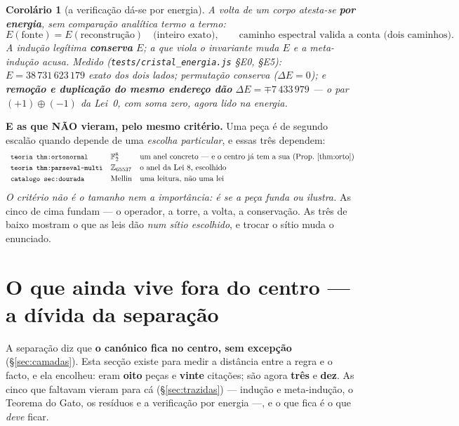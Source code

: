 \documentclass[11pt,a4paper]{article}
\newtheorem{corolario}[teorema]{Corolário}
\newcommand{\code}[1]{\texttt{\small #1}}
\begin{document}
\begin{corolario}[a verificação dá-se por energia]\label{cor:verifica-energia}
A volta de um corpo atesta-se \textbf{por energia}, sem comparação
analítica termo a termo:
\[
\boxed{
E(\text{fonte})=E(\text{reconstrução})
\quad\text{(inteiro exato)},
}
\qquad
\boxed{
\text{caminho espectral valida a conta (dois caminhos)}.
}
\]
A indução legítima \textbf{conserva} $E$; a que viola o invariante muda
$E$ e a meta-indução acusa. Medido
(\code{tests/cristal\_energia.js} \S E0, \S E5):
$E=38\,731\,623\,179$ exato dos dois lados; permutação conserva
($\Delta E=0$); e \textbf{remoção e duplicação do mesmo endereço dão}
$\Delta E=\mp7\,433\,979$ --- o par $(+1)\oplus(-1)$ da Lei~0, com soma
zero, agora lido na energia.
\end{corolario}


\medskip
\noindent\textbf{E as que NÃO vieram, pelo mesmo critério.} Uma peça é de segundo escalão
quando depende de uma \emph{escolha particular}, e essas três dependem:
\[
\begin{array}{lll}
\code{teoria thm:ortonormal} & \mathbb{F}_2^{8} & \text{um anel concreto --- e o centro já tem
a sua (Prop.~\ref{thm:orto})}\\[2pt]
\code{teoria thm:parseval-multi} & \mathbb{Z}_{65537} & \text{o anel da Lei 8, escolhido}\\[2pt]
\code{catalogo sec:dourada} & \text{Mellin} & \text{uma leitura, não uma lei}
\end{array}
\]
\emph{O critério não é o tamanho nem a importância: é se a peça funda ou ilustra.} As cinco
de cima fundam --- o operador, a torre, a volta, a conservação. As três de baixo mostram o
que as leis dão \emph{num sítio escolhido}, e trocar o sítio muda o enunciado.

\section{O que ainda vive fora do centro --- a dívida da separação}\label{sec:dividas}

A separação diz que \textbf{o canónico fica no centro, sem excepção} (\S\ref{sec:camadas}).
Esta secção existe para medir a distância entre a regra e o facto, e ela encolheu: eram
\textbf{oito} peças e \textbf{vinte} citações; são agora \textbf{três} e \textbf{dez}. As
cinco que faltavam vieram para cá (\S\ref{sec:trazidas}) --- indução e meta-indução, o
Teorema do Gato, os resíduos e a verificação por energia ---, e o que fica é o que
\emph{deve} ficar.
\end{document}
